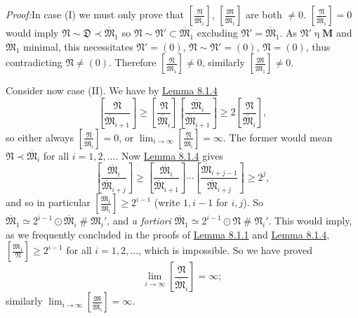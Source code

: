 \documentclass[12pt,b5paper,twoside]{article}
\newcommand{\M}{\mathbf M}
\newcommand{\reldiv}[2]{\left[\frac{#1}{#2}\right]}
\newcommand{\Proof}{\par\noindent\textit{Proof:}\enspace}
\newcommand{\lemref}[1]{\hyperref[lem:#1]{Lemma #1}}
\begin{document}
\Proof In case (I) we must only prove that
$\reldiv{\mathfrak N}{\overline{\mathfrak M}_1}$,
$\reldiv{\mathfrak M}{\overline{\mathfrak M}_1}$ are both $\ne0$.
$\reldiv{\mathfrak N}{\overline{\mathfrak M}_1}=0$ would imply
$\mathfrak N\sim\mathfrak D\prec\overline{\mathfrak M}_1$ so
$\mathfrak N\sim\mathfrak N'\subset\overline{\mathfrak M}_1$ excluding
$\mathfrak N'=\overline{\mathfrak M}_1$. As
$\mathfrak N'\mathbin\eta\M$ and $\overline{\mathfrak M}_1$ minimal, this
necessitates $\mathfrak N'=(0)$, $\mathfrak N\sim\mathfrak N'=(0)$,
$\mathfrak N=(0)$, thus contradicting $\mathfrak N\ne(0)$. Therefore
$\reldiv{\mathfrak N}{\overline{\mathfrak M}_1}\ne0$, similarly
$\reldiv{\mathfrak M}{\overline{\mathfrak M}_1}\ne0$.

Consider now case (II). We have by \lemref{8.1.4}
\[
 \reldiv{\mathfrak N}{\overline{\mathfrak M}_{i+1}}
 \geq\reldiv{\mathfrak N}{\overline{\mathfrak M}_i}
       \reldiv{\overline{\mathfrak M}_i}{\overline{\mathfrak M}_{i+1}}
 \geq2\reldiv{\mathfrak N}{\overline{\mathfrak M}_i},
\]
so either always $\reldiv{\mathfrak N}{\overline{\mathfrak M}_i}=0$, or
$\lim_{i\to\infty}\reldiv{\mathfrak N}{\overline{\mathfrak M}_i}=\infty$.
The former would mean $\mathfrak N\prec\overline{\mathfrak M}_i$ for all
$i=1,2,\ldots$. Now \lemref{8.1.4} gives
\[
 \reldiv{\overline{\mathfrak M}_i}{\overline{\mathfrak M}_{i+j}}
 \geq
 \reldiv{\overline{\mathfrak M}_i}{\overline{\mathfrak M}_{i+1}}
 \cdots
 \reldiv{\overline{\mathfrak M}_{i+j-1}}{\overline{\mathfrak M}_{i+j}}
 \geq2^j,
\]
and so in particular
$\reldiv{\overline{\mathfrak M}_1}{\overline{\mathfrak M}_i}\geq2^{i-1}$
(write $1,i-1$ for $i,j$). So
$\overline{\mathfrak M}_1\simeq2^{i-1}\odot\overline{\mathfrak M}_i
\mathbin{\#}\mathfrak M_i'$, and \emph{a fortiori}
$\overline{\mathfrak M}_1\simeq2^{i-1}\odot\mathfrak N
\mathbin{\#}\mathfrak N_i'$. This would imply, as we frequently concluded in
the proofs of \lemref{8.1.1} and \lemref{8.1.4},
$\reldiv{\overline{\mathfrak M}_1}{\mathfrak N}\geq2^{i-1}$ for all
$i=1,2,\ldots$, which is impossible. So we have proved
\[
 \lim_{i\to\infty}\reldiv{\mathfrak N}{\overline{\mathfrak M}_i}=\infty;
\]
similarly
$\lim_{i\to\infty}\reldiv{\mathfrak M}{\overline{\mathfrak M}_i}=\infty$.
\end{document}
